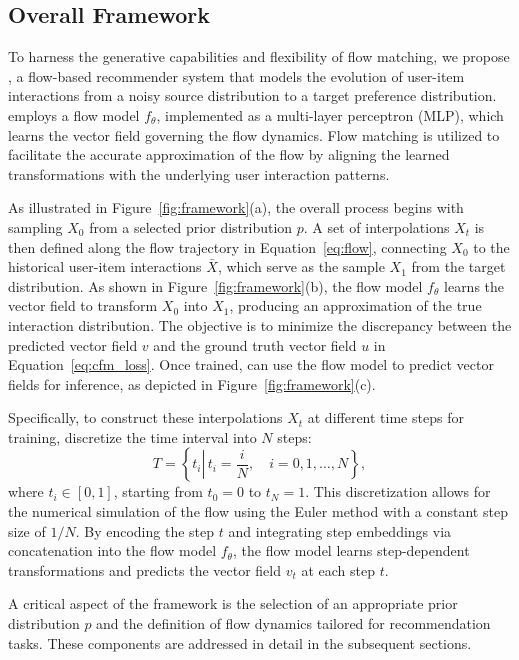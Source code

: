 \documentclass[sigconf]{acmart}
\begin{document}
\subsection{Overall Framework}
To harness the generative capabilities and flexibility of flow matching, we propose \ours, a flow-based recommender system that models the evolution of user-item interactions from a noisy source distribution to a target preference distribution.
\ours employs a flow model $f_\theta$, implemented as a multi-layer perceptron (MLP), which learns the vector field governing the flow dynamics. Flow matching is utilized to facilitate the accurate approximation of the flow by aligning the learned transformations with the underlying user interaction patterns.

As illustrated in Figure~\ref{fig:framework}(a), the overall process begins with sampling $X_0$ from a selected prior distribution $p$.
A set of interpolations $X_t$ is then defined along the flow trajectory in Equation~\ref{eq:flow}, connecting $X_0$ to the historical user-item interactions $\bar X$, which serve as the sample $X_1$ from the target distribution. As shown in Figure~\ref{fig:framework}(b), the flow model $f_\theta$ learns the vector field to transform $X_0$ into $X_1$, producing an approximation of the true interaction distribution. The objective is to minimize the discrepancy between the predicted vector field $v$ and the ground truth vector field $u$ in Equation~\ref{eq:cfm_loss}. Once trained, \ours can use the flow model to predict vector fields for inference, as depicted in Figure~\ref{fig:framework}(c).

Specifically, to construct these interpolations $X_t$ at different time steps for training, discretize the time interval into $N$ steps:
\begin{equation}
\label{eq:steps}
T=\left\{t_i \left\lvert\, t_i=\frac{i}{N}\right., \quad i=0,1, \ldots, N\right\},
\end{equation}
where $t_i \in [0, 1]$, starting from $t_0 = 0$ to $t_N = 1$.
This discretization allows for the numerical simulation of the flow using the Euler method with a constant step size of $1 / N$. 
By encoding the step $t$ and integrating step embeddings via concatenation into the flow model $f_\theta$, the flow model learns step-dependent transformations and predicts the vector field $v_t$ at each step $t$.

A critical aspect of the \ours framework is the selection of an appropriate prior distribution $p$ and the definition of flow dynamics tailored for recommendation tasks. These components are addressed in detail in the subsequent sections.
\end{document}
